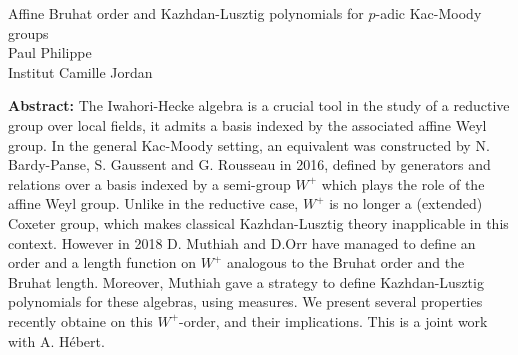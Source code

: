\documentclass[12pt,a4paper]{article}
\begin{document}
\thispagestyle{empty} 
\begin{center}
{\large   Affine Bruhat order and Kazhdan-Lusztig polynomials for $p$-adic Kac-Moody groups}\\
\vspace*{.5cm}
Paul Philippe\\
Institut Camille Jordan\\
\end{center}
\vspace*{.8cm}

{\bf Abstract:} The Iwahori-Hecke algebra is a crucial tool in the study of a reductive group over local fields, it admits a basis indexed by the associated affine Weyl group. In the general Kac-Moody setting, an equivalent was constructed by N. Bardy-Panse, S. Gaussent and G. Rousseau in 2016, defined by generators and relations over a basis indexed by a semi-group $W^+$ which plays the role of the affine Weyl group. Unlike in the reductive case, $W^+$ is no longer a (extended) Coxeter group, which makes classical Kazhdan-Lusztig theory inapplicable in this context. However in 2018 D. Muthiah and D.Orr have managed to define an order and a length function on $W^+$ analogous to the Bruhat order and the Bruhat length. Moreover, Muthiah gave a strategy to define Kazhdan-Lusztig polynomials for
these algebras, using measures. We present several properties recently obtaine on this $W^+$-order, and their implications. This is a joint work with A. H\'ebert.
\end{document}
